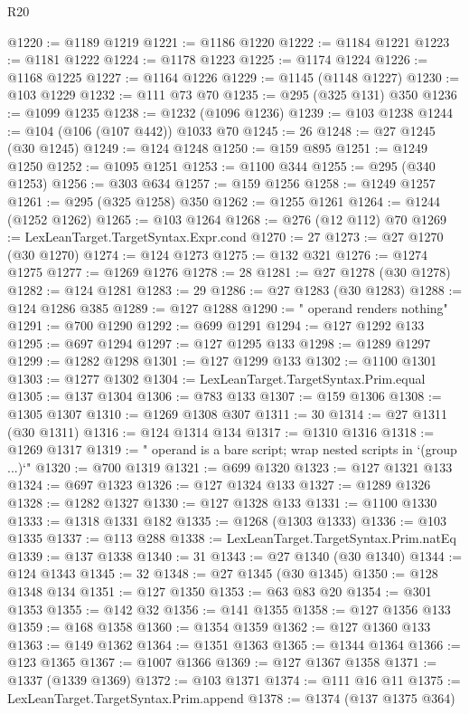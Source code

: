\begin{lexlean}{R20}
\begin{coremodule}
@1220 := @1189 @1219
@1221 := @1186 @1220
@1222 := @1184 @1221
@1223 := @1181 @1222
@1224 := @1178 @1223
@1225 := @1174 @1224
@1226 := @1168 @1225
@1227 := @1164 @1226
@1229 := @1145 (@1148 @1227)
@1230 := @103 @1229
@1232 := @111 @73 @70
@1235 := @295 (@325 @131) @350
@1236 := @1099 @1235
@1238 := @1232 (@1096 @1236)
@1239 := @103 @1238
@1244 := @104 (@106 (@107 @442)) @1033 @70
@1245 := 26
@1248 := @27 @1245 (@30 @1245)
@1249 := @124 @1248
@1250 := @159 @895
@1251 := @1249 @1250
@1252 := @1095 @1251
@1253 := @1100 @344
@1255 := @295 (@340 @1253)
@1256 := @303 @634
@1257 := @159 @1256
@1258 := @1249 @1257
@1261 := @295 (@325 @1258) @350
@1262 := @1255 @1261
@1264 := @1244 (@1252 @1262)
@1265 := @103 @1264
@1268 := @276 (@12 @112) @70
@1269 := LexLeanTarget.TargetSyntax.Expr.cond
@1270 := 27
@1273 := @27 @1270 (@30 @1270)
@1274 := @124 @1273
@1275 := @132 @321
@1276 := @1274 @1275
@1277 := @1269 @1276
@1278 := 28
@1281 := @27 @1278 (@30 @1278)
@1282 := @124 @1281
@1283 := 29
@1286 := @27 @1283 (@30 @1283)
@1288 := @124 @1286 @385
@1289 := @127 @1288
@1290 := " operand renders nothing"
@1291 := @700 @1290
@1292 := @699 @1291
@1294 := @127 @1292 @133
@1295 := @697 @1294
@1297 := @127 @1295 @133
@1298 := @1289 @1297
@1299 := @1282 @1298
@1301 := @127 @1299 @133
@1302 := @1100 @1301
@1303 := @1277 @1302
@1304 := LexLeanTarget.TargetSyntax.Prim.equal
@1305 := @137 @1304
@1306 := @783 @133
@1307 := @159 @1306
@1308 := @1305 @1307
@1310 := @1269 @1308 @307
@1311 := 30
@1314 := @27 @1311 (@30 @1311)
@1316 := @124 @1314 @134
@1317 := @1310 @1316
@1318 := @1269 @1317
@1319 := " operand is a bare script; wrap nested scripts in `(group ...)`"
@1320 := @700 @1319
@1321 := @699 @1320
@1323 := @127 @1321 @133
@1324 := @697 @1323
@1326 := @127 @1324 @133
@1327 := @1289 @1326
@1328 := @1282 @1327
@1330 := @127 @1328 @133
@1331 := @1100 @1330
@1333 := @1318 @1331 @182
@1335 := @1268 (@1303 @1333)
@1336 := @103 @1335
@1337 := @113 @288
@1338 := LexLeanTarget.TargetSyntax.Prim.natEq
@1339 := @137 @1338
@1340 := 31
@1343 := @27 @1340 (@30 @1340)
@1344 := @124 @1343
@1345 := 32
@1348 := @27 @1345 (@30 @1345)
@1350 := @128 @1348 @134
@1351 := @127 @1350
@1353 := @63 @83 @20
@1354 := @301 @1353
@1355 := @142 @32
@1356 := @141 @1355
@1358 := @127 @1356 @133
@1359 := @168 @1358
@1360 := @1354 @1359
@1362 := @127 @1360 @133
@1363 := @149 @1362
@1364 := @1351 @1363
@1365 := @1344 @1364
@1366 := @123 @1365
@1367 := @1007 @1366
@1369 := @127 @1367 @1358
@1371 := @1337 (@1339 @1369)
@1372 := @103 @1371
@1374 := @111 @16 @11
@1375 := LexLeanTarget.TargetSyntax.Prim.append
@1378 := @1374 (@137 @1375 @364)

\end{coremodule}
\end{lexlean}

